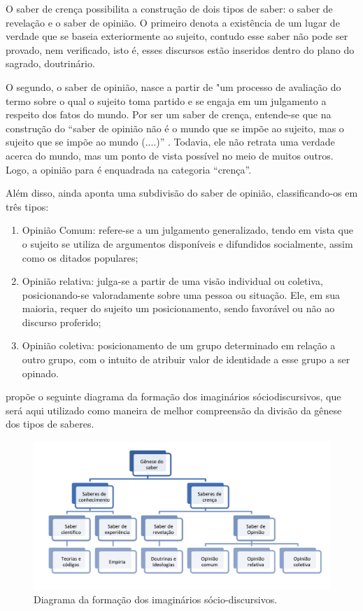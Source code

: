 \documentclass[portuguese]{textolivre}
\begin{document}
O saber de crença possibilita a construção de dois tipos de saber: o saber de revelação e o saber de opinião. O primeiro denota a existência de um lugar de verdade que se baseia exteriormente ao sujeito, contudo esse saber não pode ser provado, nem verificado, isto é, esses discursos estão inseridos dentro do plano do sagrado, doutrinário. 

O segundo, o saber de opinião, nasce a partir de "um processo de avaliação do termo sobre o qual o sujeito toma partido e se engaja em um julgamento a respeito dos fatos do mundo. Por ser um saber de crença, entende-se que na construção do “saber de opinião não é o mundo que se impõe ao sujeito, mas o sujeito que se impõe ao mundo (....)” \textcite[p. 578]{charaudeau_os_2017}. Todavia, ele não retrata uma verdade acerca do mundo, mas um ponto de vista possível no meio de muitos outros. Logo, a opinião para \textcite[p. 33]{charaudeau_conquista_2020} é enquadrada na categoria “crença”. 

Além disso, \textcite{charaudeau_os_2017} ainda aponta uma subdivisão do saber de opinião, classificando-os em três tipos: 

\begin{enumerate}[label=\Roman*.]
    \item Opinião Comum: refere-se a um julgamento generalizado, tendo em vista que o sujeito se utiliza de argumentos disponíveis e difundidos socialmente, assim como os ditados populares; 
    \item Opinião relativa: julga-se a partir de uma visão individual ou coletiva, posicionando-se valoradamente sobre uma pessoa ou situação. Ele, em sua maioria, requer do sujeito um posicionamento, sendo favorável ou não ao discurso proferido; 
    \item Opinião coletiva: posicionamento de um grupo determinado em relação a outro grupo, com o intuito de atribuir valor de identidade a esse grupo a ser opinado. 
\end{enumerate}

\textcite{procopio_os_2009} propõe o seguinte diagrama da formação dos imaginários sóciodiscursivos, que será aqui utilizado como maneira de melhor compreensão da divisão da gênese dos tipos de saberes.

\begin{figure}
    \centering
    \includegraphics[width=0.8\linewidth]{46657-Outros-142489-163426-2-20230627.png}
    \caption{Diagrama da formação dos imaginários sócio-discursivos.}
    \label{fig1}
\end{figure}
\end{document}
